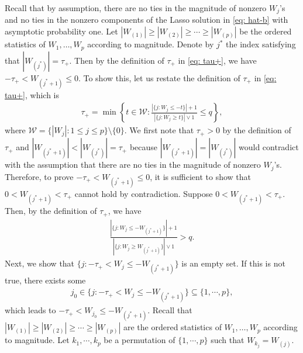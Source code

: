 \documentclass[11pt]{article}
\begin{document}
Recall that by assumption, there are no ties in the magnitude of nonzero $W_j$'s and no ties in the nonzero components of the Lasso solution in \eqref{eq: hat-b} with asymptotic probability one. Let $|W_{(1)}|\geq |W_{(2)}|\geq \cdots\geq  |W_{(p)}|$ be the ordered statistics of $W_1, \ldots, W_p$ according to magnitude. Denote by $j^{*}$ the index satisfying that $|W_{(j^{*})}|=\tau_{+}$. 
Then by the definition of $\tau_{+}$ in \eqref{eq: tau+}, we have $-\tau_{+}< W_{(j^{*}+1)}\leq 0$.
%
To show this, let us restate the definition of $\tau_{+}$ in \eqref{eq: tau+}, which is 
	\begin{align*}
	\tau_+ = \min\left\{t\in \mathcal{W}: \frac{|\{j: W_j \leq -t\}|+1}{|\{j: W_j \geq t\}|\vee 1}\leq q\right\},
	\end{align*}
	where $\mathcal{W}=\{|W_j|: 1\leq j\leq p\}\setminus\{0\}$. We
	first note that $\tau_{+}>0$ by the definition of $\tau_{+}$ and $|W_{(j^{*}+1)}|<|W_{(j^{*})}|=\tau_{+}$ because  $|W_{(j^{*}+1)}|=|W_{(j^{*})}|$ 
	would contradict with the assumption that there are no ties in the magnitude of nonzero $W_j$'s. Therefore, to prove 
	$-\tau_{+}< W_{(j^{*}+1)}\leq 0$, it is sufficient to show that $ 0<W_{(j^{*}+1)}<\tau_{+}$ cannot hold by contradiction.  Suppose $0<W_{(j^{*}+1)}<\tau_{+}$. 
	Then, by the definition of $\tau_{+}$, we have
	\begin{align}\label{eq: greater-than-q}
	\frac{|\{j: W_j \leq -W_{(j^{*}+1)}\}|+1}{|\{j: W_j \geq W_{(j^{*}+1)}\}|\vee 1}> q.
	\end{align}
	Next, we show that $\{j: -\tau_{+} <W_j \leq -W_{(j^{*}+1)}\}$ is an empty set. If this is not true, there exists some %
	\begin{align}\label{eq: j0}
	j_0\in\{j: -\tau_{+} <W_j \leq -W_{(j^{*}+1)}\}\subseteq \{1, \cdots, p\},
	\end{align} 
	which leads to $-\tau_{+} <W_{j_0} \leq -W_{(j^{*}+1)}$.  Recall that $|W_{(1)}|\geq |W_{(2)}|\geq \cdots\geq  |W_{(p)}|$ are the ordered statistics of $W_1, \ldots, W_p$ according to magnitude. Let $k_1, \cdots, k_p$ be a permutation of $\{1, \cdots, p\}$ such that $W_{k_j}=W_{(j)}$. 
\end{document}
